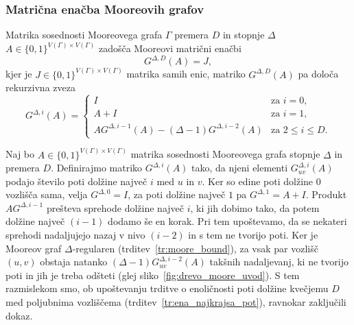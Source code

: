 \documentclass[fin1, tisk]{fmfdelo}
\begin{document}




\subsubsection{Matrična enačba Mooreovih grafov}






\begin{trditev}\label{tr:moorematrix}
Matrika sosednosti Mooreovega grafa $\Gamma$ premera $D$ in stopnje $\Delta$ $A \in \{0, 1\}^{V(\Gamma)\times V(\Gamma)}$ zadošča Mooreovi matrični enačbi 
\[G^{\Delta, D}(A) = J,\]
kjer je 
$J \in \{0, 1\}^{V(\Gamma)\times V(\Gamma)}$ matrika samih enic, matriko $G^{\Delta, D}(A)$ pa določa rekurzivna zveza
\begin{equation*}
G^{\Delta, i}(A) = \begin{cases} 
I & \text{za $i = 0$,} \\
A + I & \text{za $i = 1$,} \\
A G^{\Delta, i-1}(A) - (\Delta-1) G^{\Delta, i-2}(A) & \text{za $2 \leq i \leq D$}.
\end{cases}
\end{equation*}
\end{trditev}

\begin{dokaz}
   Naj bo $A \in \{0, 1\}^{V(\Gamma)\times V(\Gamma)}$ matrika sosednosti Mooreovega grafa stopnje $\Delta$
in premera $D$. 
Definirajmo matriko $G^{\Delta, i}(A)$ 
tako, da njeni elementi $G^{\Delta, i}_{uv}(A)$ podajo število poti  
dolžine največ $i$ med $u$ in $v$. Ker so edine poti dolžine $0$ vozlišča sama, 
velja $G^{\Delta, 0} = I$, za poti dolžine največ $1$ pa $G^{\Delta, 1} = A + I$.
Produkt $AG^{\Delta, i-1}$ prešteva sprehode dolžine največ $i$, ki jih dobimo tako, 
da potem dolžine največ $(i-1)$ dodamo še en korak. Pri tem upoštevamo, da se nekateri
sprehodi nadaljujejo nazaj v nivo $(i-2)$ in s tem ne tvorijo poti.
Ker je Mooreov graf $\Delta$-regularen (trditev~\ref{tr:moore_bound}), za vsak par vozlišč $(u, v)$ obstaja natanko
$(\Delta - 1)G^{\Delta, i-2}_{uv}(A)$ takšnih nadaljevanj, ki ne tvorijo poti in jih je treba 
odšteti (glej sliko~\ref{fig:drevo_moore_uvod}). 
S tem razmislekom smo, ob upoštevanju trditve o enoličnosti poti dolžine kvečjemu $D$ med poljubnima vozliščema (trditev~\ref{tr:ena_najkrajsa_pot}), 
ravnokar zaključili dokaz.
\end{dokaz}
\end{document}

